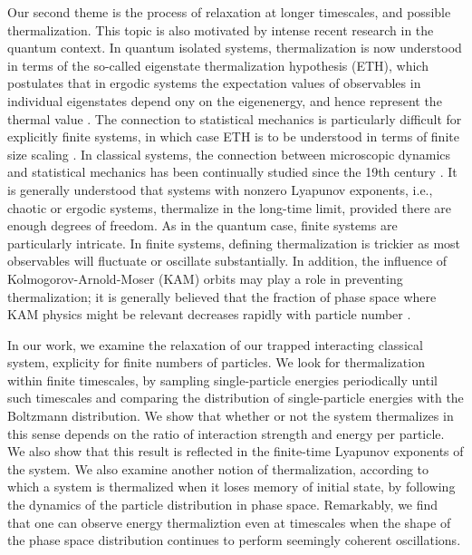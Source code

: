 \documentclass[a4paper, onecolumn]{revtex4-1}
\begin{document}
Our second theme is the process of relaxation at longer timescales, and possible thermalization.
This topic is also motivated by intense recent research in the quantum context.  In quantum isolated
systems, thermalization is now understood in terms of the so-called eigenstate thermalization
hypothesis (ETH), which postulates that in ergodic systems the expectation values of observables in
individual eigenstates depend ony on the eigenenergy, and hence represent the thermal value
\cite{PolkovnikovRigol_AdvPhys2016, BorgonoviIzrailevSantos_PhysRep2016,
  ETH_Deutsch_Srednicki_Rigol}.  The connection to statistical mechanics is particularly difficult
for explicitly finite systems, in which case ETH is to be understood in terms of finite size scaling
\cite{Beugeling_ETHscaling_PRE14}.  In classical systems, the connection between microscopic
dynamics and statistical mechanics has been continually studied since the 19th century
\cite{Gaspard_book_1998, Dorfman_book_1999, Dumas_book_KAMstory, Boltzmann_legacy_book,
  EckmannRuelle_RMP85, Gaspard_PhysicaA06}.  It is generally understood that systems with nonzero
Lyapunov exponents, i.e., chaotic or ergodic systems, thermalize in the long-time limit, provided
there are enough degrees of freedom.  As in the quantum case, finite systems are particularly
intricate.  In finite systems, defining thermalization is trickier as most observables will
fluctuate or oscillate substantially.  In addition, the influence of Kolmogorov-Arnold-Moser (KAM)
orbits may play a role in preventing thermalization; it is generally believed that the fraction of
phase space where KAM physics might be relevant decreases rapidly with particle number
\cite{Dumas_book_KAMstory}.

In our work, we examine the relaxation of our trapped interacting classical system, explicity for
finite numbers of particles.  We look for thermalization within finite timescales, by sampling
single-particle energies periodically until such timescales and comparing the distribution of
single-particle energies with the Boltzmann distribution.  We show that whether or not the system
thermalizes in this sense depends on the ratio of interaction strength and energy per particle.  We
also show that this result is reflected in the finite-time Lyapunov exponents of the system.
%
We also examine another notion of thermalization, according to which a system is thermalized when it
loses memory of initial state, by following the dynamics of the particle distribution in phase
space.  Remarkably, we find that one can observe energy thermaliztion even at timescales when the
shape of the phase space distribution continues to perform seemingly coherent oscillations.
\end{document}
